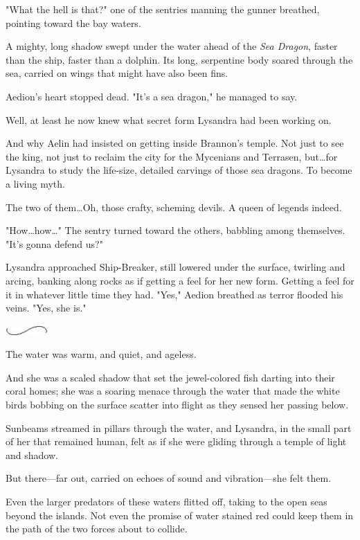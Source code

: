 "What the hell is that?"
one of the sentries manning the gunner breathed, pointing toward the bay waters.

A mighty, long shadow swept under the water ahead of the \emph{Sea Dragon}, faster than the ship, faster than a dolphin.
Its long, serpentine body soared through the sea, carried on wings that might have also been fins.

Aedion's heart stopped dead.
"It's a sea dragon," he managed to say.

Well, at least he now knew what secret form Lysandra had been working on.

And why Aelin had insisted on getting inside Brannon's temple.
Not just to see the king, not just to reclaim the city for the Mycenians and Terrasen, but\ldots for Lysandra to study the life-size, detailed carvings of those sea dragons.
To become a living myth.

The two of them\ldots Oh, those crafty, scheming devils.
A queen of legends indeed.

"How\ldots how\ldots" The sentry turned toward the others, babbling among themselves.
"It's gonna defend us?"

Lysandra approached Ship-Breaker, still lowered under the surface, twirling and arcing, banking along rocks as if getting a feel for her new form.
Getting a feel for it in whatever little time they had.
"Yes," Aedion breathed as terror flooded his veins.
"Yes, she is."

\begin{center}
	\includegraphics[width=0.65in,height=0.13in]{images/seperator}
\end{center}

The water was warm, and quiet, and ageless.

And she was a scaled shadow that set the jewel-colored fish darting into their coral homes; she was a soaring menace through the water that made the white birds bobbing on the surface scatter into flight as they sensed her passing below.

Sunbeams streamed in pillars through the water, and Lysandra, in the small part of her that remained human, felt as if she were gliding through a temple of light and shadow.

But there---far out, carried on echoes of sound and vibration---she felt them.

Even the larger predators of these waters flitted off, taking to the open seas beyond the islands.
Not even the promise of water stained red could keep them in the path of the two forces about to collide.

